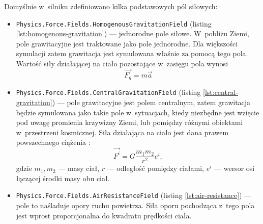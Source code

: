 Domyślnie w~silniku zdefiniowano kilka podstawowych pól siłowych:
\begin{itemize}
	\item \verb|Physics.Force.Fields.HomogenousGravitationField| (listing \ref{lst:homogenous-gravitation}) --- jednorodne pole siłowe. W~pobliżu Ziemi, pole grawitacyjne jest traktowane jako pole jednorodne. Dla większości symulacji zatem grawitacja jest symulowana właśnie za pomocą tego pola. Wartość siły działającej na ciało pozostające w~zasięgu pola wynosi \cite{bib:resnick2}
	\begin{equation}
	\vec{F_g} = m \vec{a}
	\end{equation}
	\item \verb|Physics.Force.Fields.CentralGravitationField| (listing \ref{lst:central-gravitation}) --- pole grawitacyjne jest polem centralnym, zatem grawitacja będzie symulowana jako takie pole w~sytuacjach, kiedy niezbędne jest wzięcie pod uwagę promienia krzywizny Ziemi, lub pomiędzy różnymi obiektami w~przestrzeni kosmicznej. Siła działająca na ciało jest dana prawem powszechnego ciążenia \cite{bib:prawopowszechnegociazenia}: 
	\begin{equation}
	\vec{F^i} = G \frac{m_1 m_2}{r^2} e^i,
	\end{equation} 
	gdzie\newline
	$m_1, m_2$ --- masy ciał,\newline
	$r$ --- odległość pomiędzy ciałami,\newline
	$e^i$ --- wersor osi łączącej środki masy obu ciał.
	\item \verb|Physics.Force.Fields.AirResistanceField| (listing \ref{lst:air-resistance}) --- pole to naśladuje opory ruchu powietrza. Siła oporu pochodząca z~tego pola jest wprost proporcjonalna do kwadratu prędkości ciała.
\end{itemize}









